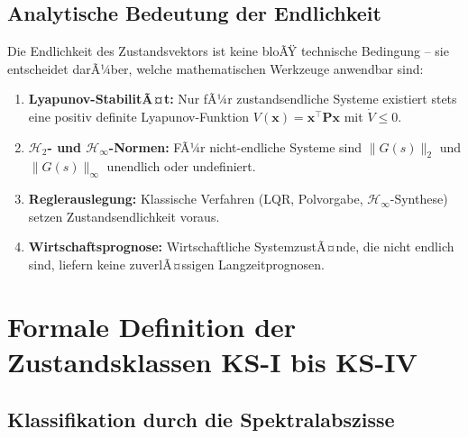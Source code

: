 ﻿\documentclass[12pt, a4paper, titlepage]{report}
\theoremstyle{definition}
\theoremstyle{remark}
\newcommand{\vx}{\bm{x}}
\newcommand{\vP}{\bm{P}}
\newcommand{\T}{\top}
\begin{document}
\section{Analytische Bedeutung der Endlichkeit}

Die Endlichkeit des Zustandsvektors ist keine bloÃŸ technische Bedingung -- sie
entscheidet darÃ¼ber, welche mathematischen Werkzeuge anwendbar sind:

\begin{enumerate}[label=(\arabic*)]
  \item \textbf{Lyapunov-StabilitÃ¤t:} Nur fÃ¼r zustandsendliche Systeme existiert stets
    eine positiv definite Lyapunov-Funktion $V(\vx) = \vx^\T\vP\vx$ mit
    $\dot{V} \leq 0$.
  \item \textbf{$\mathcal{H}_2$- und $\mathcal{H}_\infty$-Normen:} FÃ¼r
    nicht-endliche Systeme sind $\|G(s)\|_2$ und $\|G(s)\|_\infty$ unendlich oder
    undefiniert.
  \item \textbf{Reglerauslegung:} Klassische Verfahren (LQR, Polvorgabe, $\mathcal{H}_\infty$-Synthese)
    setzen Zustandsendlichkeit voraus.
  \item \textbf{Wirtschaftsprognose:} Wirtschaftliche SystemzustÃ¤nde, die nicht endlich
    sind, liefern keine zuverlÃ¤ssigen Langzeitprognosen.
\end{enumerate}

\chapter{Formale Definition der Zustandsklassen KS-I bis KS-IV}
\label{sec:klassen}

\section{Klassifikation durch die Spektralabszisse}
\end{document}

